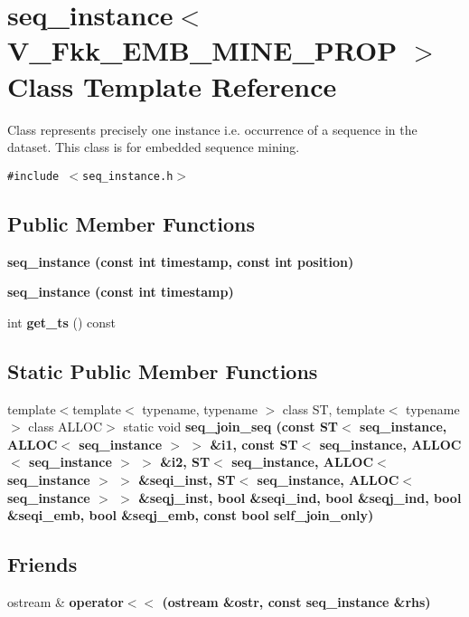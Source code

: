 \section{seq\_\-instance$<$ V\_\-Fkk\_\-EMB\_\-MINE\_\-PROP $>$ Class Template Reference}
\label{classseq__instance_3_01V__Fkk__EMB__MINE__PROP_01_4}
Class represents precisely one instance i.e. occurrence of a sequence in the dataset. This class is for embedded sequence mining.  


{\tt \#include $<$seq\_\-instance.h$>$}

\subsection*{Public Member Functions}
\begin{CompactItemize}
\item 
\bf{seq\_\-instance} (const int timestamp, const int position)
\item 
\bf{seq\_\-instance} (const int timestamp)
\item 
int \textbf{get\_\-ts} () const \label{classseq__instance_3_01V__Fkk__EMB__MINE__PROP_01_4_0e4582c199a83e5587960d692085ab28}

\end{CompactItemize}
\subsection*{Static Public Member Functions}
\begin{CompactItemize}
\item 
template$<$template$<$ typename, typename $>$ class ST, template$<$ typename $>$ class ALLOC$>$ static void \bf{seq\_\-join\_\-seq} (const ST$<$ \bf{seq\_\-instance}, ALLOC$<$ \bf{seq\_\-instance} $>$ $>$ \&i1, const ST$<$ \bf{seq\_\-instance}, ALLOC$<$ \bf{seq\_\-instance} $>$ $>$ \&i2, ST$<$ \bf{seq\_\-instance}, ALLOC$<$ \bf{seq\_\-instance} $>$ $>$ \&seqi\_\-inst, ST$<$ \bf{seq\_\-instance}, ALLOC$<$ \bf{seq\_\-instance} $>$ $>$ \&seqj\_\-inst, bool \&seqi\_\-ind, bool \&seqj\_\-ind, bool \&seqi\_\-emb, bool \&seqj\_\-emb, const bool self\_\-join\_\-only)
\end{CompactItemize}
\subsection*{Friends}
\begin{CompactItemize}
\item 
ostream \& \bf{operator$<$$<$} (ostream \&ostr, const \bf{seq\_\-instance} \&rhs)
\end{CompactItemize}


